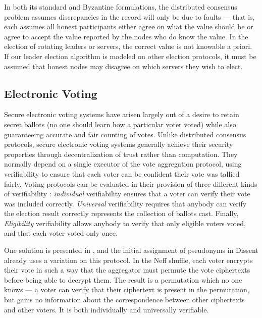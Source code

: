     In both its standard and Byzantine formulations, the distributed consensus
    problem assumes discrepancies in the record will only be due to faults ---
    that is, each assumes all honest participants either agree on what the value
    should be or agree to accept the value reported by the nodes who do know the
    value.  In the election of rotating leaders or servers, the correct value is
    not knowable a priori. If our leader election algorithm is modeled on other
    election protocols, it must be assumed that honest nodes may disagree on
    which servers they wish to elect.

  \subsection{Electronic Voting}
    Secure electronic voting systems have arisen largely out of a desire to
    retain secret ballots (no one should learn how a particular voter voted)
    while also guaranteeing accurate and fair counting of votes. Unlike
    distributed consensus protocols, secure electronic voting systems generally
    achieve their security properties through decentralization of trust rather
    than computation. They normally depend on a single executor of the vote
    aggregation protocol, using verifiability to ensure that each voter can be
    confident their vote was tallied fairly. Voting protocols can be evaluated
    in their provision of three different kinds of verifiability
    \cite{kremer_election_2010}: \emph{individual} verifiability ensures that a
    voter can verify their vote was included correctly. \emph{Universal}
    verifiability requires that anybody can verify the election result correctly
    represents the collection of ballots cast. Finally, \emph{Eligibility}
    verifiability allows anybody to verify that only eligible voters voted, and
    that each voter voted only once.

    One solution is presented in \cite{neff_verifiable_2001},
    and the initial assignment of pseudonyms in Dissent already uses a variation
    on this protocol. In the Neff shuffle, each voter encrypts their vote in
    such a way that the aggregator must permute the vote ciphertexts before
    being able to decrypt them. The result is a permutation which no one knows
    --- a voter can verify that their ciphertext is present in the permutation,
    but gains no information about the correspondence between other ciphertexts
    and other voters. It is both individually and universally verifiable.

